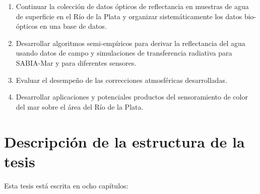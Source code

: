     \begin{enumerate}
    \item Continuar la colección de datos ópticos de reflectancia en muestras de agua de superficie en el Río de la Plata y organizar sistemáticamente los datos bio-ópticos en una base de datos. 
    \item Desarrollar algoritmos semi-empíricos para derivar la reflectancia del agua usando datos de campo y simulaciones de transferencia radiativa para SABIA-Mar y para diferentes sensores.
    \item Evaluar el desempeño de las correcciones atmosféricas desarrolladas.
    \item Desarrollar aplicaciones y potenciales productos del sensoramiento de color del mar sobre el área del Río de la Plata. 
    \end{enumerate}

\section{Descripción de la estructura de la tesis}
\label{int:s:estructura}

    Esta tesis está escrita en ocho capítulos:
    

